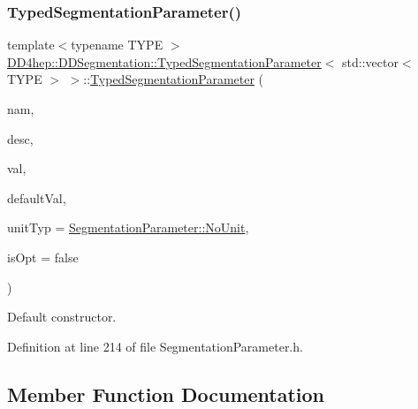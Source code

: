 \subsubsection{\texorpdfstring{Typed\+Segmentation\+Parameter()}{TypedSegmentationParameter()}}
{\footnotesize\ttfamily template$<$typename T\+Y\+PE $>$ \\
\hyperlink{class_d_d4hep_1_1_d_d_segmentation_1_1_typed_segmentation_parameter}{D\+D4hep\+::\+D\+D\+Segmentation\+::\+Typed\+Segmentation\+Parameter}$<$ std\+::vector$<$ T\+Y\+PE $>$ $>$\+::\hyperlink{class_d_d4hep_1_1_d_d_segmentation_1_1_typed_segmentation_parameter}{Typed\+Segmentation\+Parameter} (\begin{DoxyParamCaption}\item[{const std\+::string \&}]{nam,  }\item[{const std\+::string \&}]{desc,  }\item[{std\+::vector$<$ T\+Y\+PE $>$ \&}]{val,  }\item[{const std\+::vector$<$ T\+Y\+PE $>$ \&}]{default\+Val,  }\item[{\hyperlink{class_d_d4hep_1_1_d_d_segmentation_1_1_segmentation_parameter_a36f5f8b8d812b2a2b81363377565d8d4}{Segmentation\+Parameter\+::\+Unit\+Type}}]{unit\+Typ = {\ttfamily \hyperlink{class_d_d4hep_1_1_d_d_segmentation_1_1_segmentation_parameter_a36f5f8b8d812b2a2b81363377565d8d4ab217a538e0ac077135786260a2221c14}{Segmentation\+Parameter\+::\+No\+Unit}},  }\item[{bool}]{is\+Opt = {\ttfamily false} }\end{DoxyParamCaption})\hspace{0.3cm}{\ttfamily [inline]}}



Default constructor. 



Definition at line 214 of file Segmentation\+Parameter.\+h.



\subsection{Member Function Documentation}
\hypertarget{class_d_d4hep_1_1_d_d_segmentation_1_1_typed_segmentation_parameter_3_01std_1_1vector_3_01_t_y_p_e_01_4_01_4_a399394999d0a86783838625ed8545c95}{}\label{class_d_d4hep_1_1_d_d_segmentation_1_1_typed_segmentation_parameter_3_01std_1_1vector_3_01_t_y_p_e_01_4_01_4_a399394999d0a86783838625ed8545c95} 
